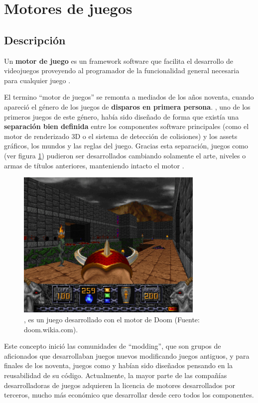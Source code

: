 \section{Motores de juegos}
\subsection{Descripción}
Un \textbf{motor de juego} es un framework software que facilita el desarrollo de videojuegos proveyendo al programador de la funcionalidad general necesaria para cualquier juego \cite{game_engine}.

El termino ``motor de juegos'' se remonta a mediados de los años noventa, cuando apareció el género de los juegos de \textbf{disparos en primera persona}. , uno de los primeros juegos de este género, había sido diseñado de forma que existía una \textbf{separación bien definida} entre los componentes software principales (como el motor de renderizado 3D o el sistema de detección de colisiones) y los assets gráficos, los mundos y las reglas del juego. Gracias esta separación, juegos como  (ver figura \ref{heretic}) pudieron ser desarrollados cambiando solamente el arte, niveles o armas de títulos anteriores, manteniendo intacto el motor \cite{game_engine_architecture}. 

\begin{figure}[h]
    \centering
    \includegraphics[width=0.8\textwidth]{images/estadodelarte/motores/heretic}
    \caption{, es un juego desarrollado con el motor de Doom (Fuente: doom.wikia.com).}
    \label{heretic}
\end{figure}

Este concepto inició las comunidades de ``modding'', que son grupos de aficionados que desarrollaban juegos nuevos modificando juegos antiguos, y para finales de los noventa, juegos como  y  habían sido diseñados pensando en la reusabilidad de su código. Actualmente, la mayor parte de las compañías desarrolladoras de juegos adquieren la licencia de motores desarrollados por terceros, mucho más económico que desarrollar desde cero todos los componentes.

